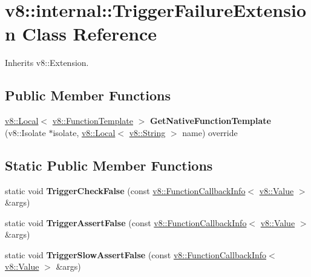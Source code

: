 \hypertarget{classv8_1_1internal_1_1TriggerFailureExtension}{}\section{v8\+:\+:internal\+:\+:Trigger\+Failure\+Extension Class Reference}
\label{classv8_1_1internal_1_1TriggerFailureExtension}


Inherits v8\+::\+Extension.

\subsection*{Public Member Functions}
\begin{DoxyCompactItemize}
\item 
\mbox{\label{classv8_1_1internal_1_1TriggerFailureExtension_a1a9db20d203fabfa5430ad87fbb9b32a}} 
\mbox{\hyperlink{classv8_1_1Local}{v8\+::\+Local}}$<$ \mbox{\hyperlink{classv8_1_1FunctionTemplate}{v8\+::\+Function\+Template}} $>$ {\bfseries Get\+Native\+Function\+Template} (v8\+::\+Isolate $\ast$isolate, \mbox{\hyperlink{classv8_1_1Local}{v8\+::\+Local}}$<$ \mbox{\hyperlink{classv8_1_1String}{v8\+::\+String}} $>$ name) override
\end{DoxyCompactItemize}
\subsection*{Static Public Member Functions}
\begin{DoxyCompactItemize}
\item 
\mbox{\label{classv8_1_1internal_1_1TriggerFailureExtension_a713f90a95ae17c510df51cb3b70fd4f0}} 
static void {\bfseries Trigger\+Check\+False} (const \mbox{\hyperlink{classv8_1_1FunctionCallbackInfo}{v8\+::\+Function\+Callback\+Info}}$<$ \mbox{\hyperlink{classv8_1_1Value}{v8\+::\+Value}} $>$ \&args)
\item 
\mbox{\label{classv8_1_1internal_1_1TriggerFailureExtension_aada744e2dfb388e5676111344d728547}} 
static void {\bfseries Trigger\+Assert\+False} (const \mbox{\hyperlink{classv8_1_1FunctionCallbackInfo}{v8\+::\+Function\+Callback\+Info}}$<$ \mbox{\hyperlink{classv8_1_1Value}{v8\+::\+Value}} $>$ \&args)
\item 
\mbox{\label{classv8_1_1internal_1_1TriggerFailureExtension_aadadd0a65000877c4b8b861b931e473b}} 
static void {\bfseries Trigger\+Slow\+Assert\+False} (const \mbox{\hyperlink{classv8_1_1FunctionCallbackInfo}{v8\+::\+Function\+Callback\+Info}}$<$ \mbox{\hyperlink{classv8_1_1Value}{v8\+::\+Value}} $>$ \&args)
\end{DoxyCompactItemize}


